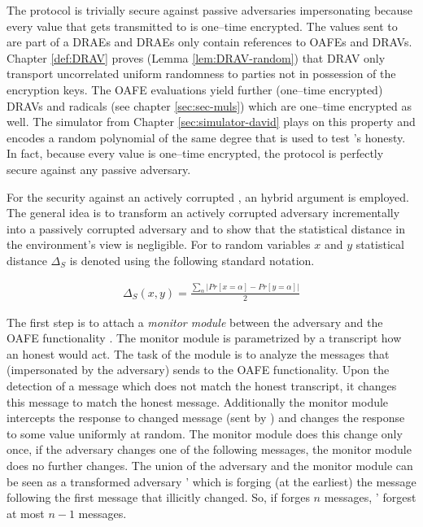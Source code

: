 The protocol is trivially secure against passive adversaries impersonating
\JWpTwo{} because every value that gets transmitted to \JWpTwo{} is one--time
encrypted. The values sent to \JWpTwo{} are part of a DRAEs and DRAEs only
contain references to OAFEs and DRAVs. Chapter \ref{def:DRAV} proves (Lemma
\ref{lem:DRAV-random}) that DRAV only transport uncorrelated uniform randomness
to parties not in possession of the encryption keys. The OAFE evaluations yield
further (one--time encrypted) DRAVs and radicals (see chapter
\ref{sec:sec-muls}) which are one--time encrypted as well. The simulator from
Chapter \ref{sec:simulator-david} plays on this property and encodes a random
polynomial of the same degree that is used to test \JWpTwo{}'s honesty. In fact,
because every value is one--time encrypted, the protocol is perfectly secure
against any passive adversary.

For the security against an actively corrupted \JWpTwo{}, an hybrid argument is
employed. The general idea is to transform an actively corrupted adversary
incrementally into a passively corrupted adversary and to show that the
statistical distance in the environment's view is negligible. For to random
variables $x$ and $y$ statistical distance $\Delta_S$ is denoted using the
following standard notation.

\begin{align*}
  \Delta_S(x,y) = \frac{\sum_\alpha \left|Pr[x=\alpha] - Pr[y=\alpha]\right|}{2}
\end{align*}

\noindent{}The first step is to attach a \emph{monitor module} between the
adversary \JWadv{} and the OAFE functionality \JWfuncSymOAFE{}. The monitor
module is parametrized by a transcript how an honest \JWpTwo{} would act. The
task of the module is to analyze the messages that \JWpTwo{} (impersonated by
the adversary) sends to the OAFE functionality. Upon the detection of a message
which does not match the honest transcript, it changes this message to match the
honest message. Additionally the monitor module intercepts the response to
changed message (sent by \JWfuncSymOAFE{}) and changes the response to some
value uniformly at random. The monitor module does this change only once, if the
adversary changes one of the following messages, the monitor module does no
further changes. The union of the adversary \JWadv{} and the
monitor module can be seen as a transformed adversary \JWadv{}' which is forging
(at the earliest) the message following the first message that \JWadv{}
illicitly changed. So, if \JWadv{} forges $n$ messages, \JWadv{}' forgest at
most $n-1$ messages.

